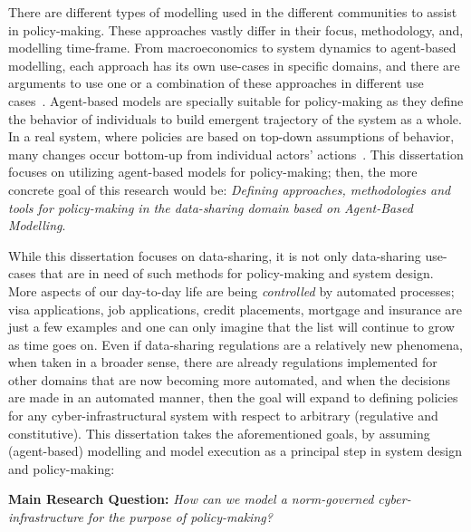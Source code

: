 There are different types of modelling used in the different communities to assist in policy-making. These approaches vastly differ in their focus, methodology, and, modelling time-frame. From macroeconomics to system dynamics to agent-based modelling, each approach has its own use-cases in specific domains, and there are arguments to use one or a combination of these approaches in different use cases~\cite{Scholl2001,silverman2023,dosi2019,Dignum2008}. Agent-based models are specially suitable for policy-making as they define the behavior of individuals to build emergent trajectory of the system as a whole. In a real system, where policies are based on top-down assumptions of behavior, many changes occur bottom-up from individual actors' actions~\cite{Dignum2008}. This dissertation focuses on utilizing agent-based models for policy-making; then, the more concrete goal of this research would be: \textit{Defining approaches, methodologies and tools for policy-making in the data-sharing domain based on Agent-Based Modelling}.



While this dissertation focuses on data-sharing, it is not only data-sharing use-cases that are in need of such methods for policy-making and system design. More aspects of our day-to-day life are being \textit{controlled} by automated processes; visa applications, job applications, credit placements, mortgage and insurance are just a few examples and one can only imagine that the list will continue to grow as time goes on. Even if data-sharing regulations are a relatively new phenomena, when taken in a broader sense, there are already regulations implemented for other domains that are now becoming more automated, and when the decisions are made in an automated manner, then the goal will expand to defining policies for any cyber-infrastructural system with respect to arbitrary (regulative and constitutive). This dissertation takes the aforementioned goals, by assuming (agent-based) modelling and model execution as a principal step in system design and policy-making:

\begin{displayquote}
\textbf{Main Research Question:} \textit{How can we model a norm-governed cyber-infrastructure for the purpose of policy-making?}
\end{displayquote}



